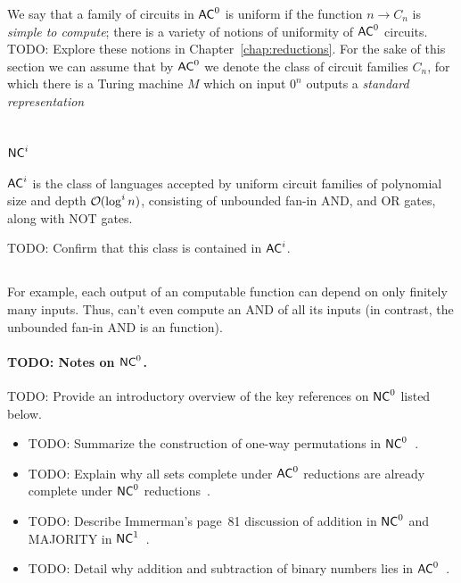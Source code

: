 We say that a family of circuits in $\mathsf{AC}^{0}$ is uniform if the function $n \rightarrow C_n$ is
\emph{simple to compute}; there is a variety of notions of uniformity of $\mathsf{AC}^{0}$ circuits.
TODO: Explore these notions in Chapter~\ref{chap:reductions}. For the sake of this section we can assume
that by $\mathsf{AC}^{0}$ we denote the class of circuit families $C_n$, for which there is a 
 Turing machine $M$ which on input $0^n$ outputs a \emph{standard representation}


\section{\texorpdfstring{$\mathsf{NC}^{i}$}{NC\string^i}}
$\mathsf{AC}^{i}$ is the class of languages accepted by uniform circuit
families of polynomial size and depth $\bigO(\log^i n)$, consisting of unbounded fan-in
AND, and OR gates, along with NOT gates.

TODO: Confirm that this class is contained in $\mathsf{AC}^{i}$.

\subsection{}
For example, each output of an  computable function can depend on only finitely many
inputs. Thus,  can't even compute an AND of all its inputs (in contrast, the unbounded
fan-in AND is an  function).
\paragraph{TODO: Notes on $\mathsf{NC}^{0}$.}
TODO: Provide an introductory overview of the key references on $\mathsf{NC}^{0}$ listed below.
\begin{itemize}
\item TODO: Summarize the construction of one-way permutations in $\mathsf{NC}^{0}$~\cite{10.1016/0020-01908790053-6}.
\item TODO: Explain why all sets complete under $\mathsf{AC}^{0}$ reductions are already complete under $\mathsf{NC}^{0}$ reductions~\cite{10.1145/258533.258671,AGRAWAL1998127}.
\item TODO: Describe Immerman's page~81 discussion of addition in $\mathsf{NC}^{0}$ and MAJORITY in $\mathsf{NC}^{1}$~\cite{Immerman1999-IMMDC}.
\item TODO: Detail why addition and subtraction of binary numbers lies in $\mathsf{AC}^{0}$~\cite{27676}.
\end{itemize}


